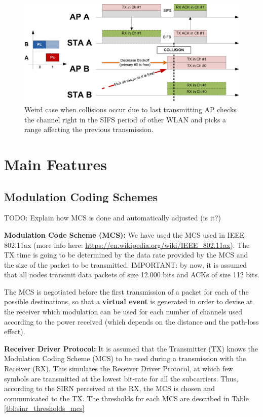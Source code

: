 \documentclass[a4paper]{article}
\begin{document}
\begin{figure}
	\centering
  \includegraphics[scale=0.7]{img/ACK_issue.png}
  \caption{Weird case when collisions occur due to last transmitting AP checks the channel right in the SIFS period of other WLAN and picks a range affecting the previous transmission.}
  \label{fig:boat1}
\end{figure}

\section{Main Features}

\subsection{Modulation Coding Schemes}
TODO: Explain how MCS is done and automatically adjusted (is it?)

\textbf{Modulation Code Scheme (MCS):} We have used the MCS used in IEEE 802.11ax (more info here: \url{https://en.wikipedia.org/wiki/IEEE_802.11ax}). The TX time is going to be determined by the data rate provided by the MCS and the size of the packet to be transmitted. IMPORTANT: by now, it is assumed that all nodes transmit data packets of size 12.000 bits and ACKs of size 112 bits.

The MCS is negotiated before the first transmission of a packet for each of the possible destinations, so that a \textbf{virtual event} is generated in order to devise at the receiver which modulation can be used for each number of channels used according to the power received (which depends on the distance and the path-loss effect).

\textbf{Receiver Driver Protocol:} It is assumed that the Transmitter (TX) knows the Modulation Coding Scheme (MCS) to be used during a transmission with the Receiver (RX). This simulates the Receiver Driver Protocol, at which few symbols are transmitted at the lowest bit-rate for all the subcarriers. Thus, according to the SIRN perceived at the RX, the MCS is chosen and communicated to the TX. The thresholds for each MCS are described in Table \ref{tbl:sinr_thresholds_mcs}
\end{document}
